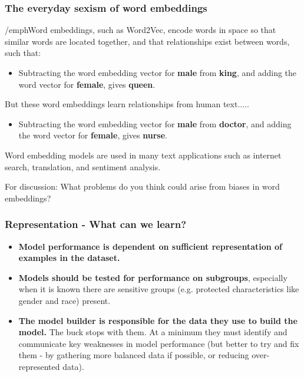 \documentclass{beamer}
\begin{document}
\begin{frame}
\frametitle{The everyday sexism of word embeddings}


\begin{itemize}
    \item /emph{Word embeddings}, such as Word2Vec, encode words in space so that similar words are located together, and that relationships exist between words, such that:
    \begin{itemize}
        \item {Subtracting the word embedding vector for \textbf{male} from \textbf{king}, and adding the word vector for \textbf{female}, gives \textbf{queen}.}
    \end{itemize}
    \item{But these word embeddings learn relationships from human text.....}
        \begin{itemize}
        \item {Subtracting the word embedding vector for \textbf{male} from \textbf{doctor}, and adding the word vector for \textbf{female}, gives \textbf{nurse}.}
        \end{itemize}
    \item{Word embedding models are used in many text applications such as internet search, translation, and sentiment analysis.
    \item For discussion: What problems do you think could arise from biases in word embeddings?}
\end{itemize}

\end{frame}


\begin{frame}
\frametitle{Representation - What can we learn?}
\begin{itemize}
\setlength{\itemsep}{5mm} %
    \item \textbf{Model performance is dependent on sufficient representation of examples in the dataset.}
    
    \item \textbf{Models should be tested for performance on subgroups}, especially when it is known there are sensitive groups (e.g. protected characteristics like gender and race) present.
    
    \item \textbf{The model builder is responsible for the data they use to build the model.} The buck stops with them. At a minimum they must identify and communicate key weaknesses in model performance (but better to try and fix them - by gathering more balanced data if possible, or reducing over-represented data).
\end{itemize}
\end{frame}
\end{document}
